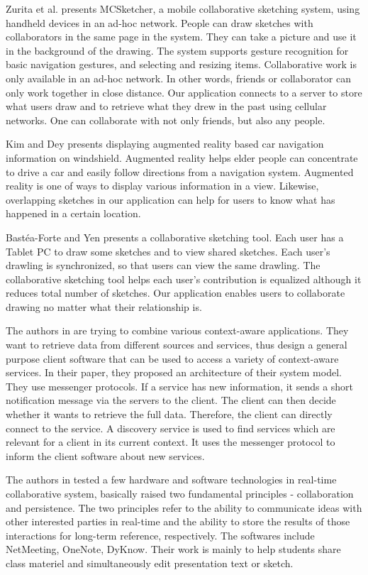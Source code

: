 \documentclass{chi2009}
\begin{document}
Zurita et al. \cite{sketching:zurita} presents MCSketcher, a mobile
collaborative sketching system, using handheld devices in an ad-hoc network.
People can draw sketches with collaborators in the same page in the system.
They can take a picture and use it in the background of the drawing. The system
supports gesture recognition for basic navigation gestures, and selecting and
resizing items. Collaborative work is only available in an ad-hoc network. In
other words, friends or collaborator can only work together in close distance.
Our application connects to a server to store what users draw and to retrieve
what they drew in the past using cellular networks. One can collaborate with
not only friends, but also any people.

Kim and Dey \cite{augmented_reality:kim} presents displaying augmented reality
based car navigation information on windshield. Augmented reality helps elder
people can concentrate to drive a car and easily follow directions from a
navigation system. Augmented reality is one of ways to display various
information in a view. Likewise, overlapping sketches in our application can help for users to
know what has happened in a certain location.

Bast\'{e}a-Forte and Yen \cite{brainstorming:marcello} presents a collaborative
sketching tool. Each user has a Tablet PC to draw some sketches and to view
shared sketches. Each user's drawling is synchronized, so that users can view
the same drawling. The collaborative sketching tool helps each user's
contribution is equalized although it reduces total number of sketches. Our
application enables users to collaborate drawing no matter what their
relationship is.

The authors in \cite{context:weis} are trying to combine various context-aware
applications. They want to retrieve data from different sources and services,
thus design a general purpose client software that can be used to access a
variety of context-aware services. In their paper, they proposed an
architecture of their system model. They use messenger protocols. If a service
has new information, it sends a short notification message via the servers to
the client. The client can then decide whether it wants to retrieve the full
data. Therefore, the client can directly connect to the service. A discovery
service is used to find services which are relevant for a client in its current
context. It uses the messenger protocol to inform the client software about new
services.

 The authors in \cite{ink:lindell} tested a few hardware and software
technologies in real-time collaborative system, basically raised two
fundamental principles - collaboration and persistence. The two principles
refer to the ability to communicate ideas with other interested parties in
real-time and the ability to store the results of those interactions for
long-term reference, respectively. The softwares include NetMeeting, OneNote,
DyKnow. Their work is mainly to help students share class materiel and
simultaneously edit presentation text or  sketch.
\end{document}
